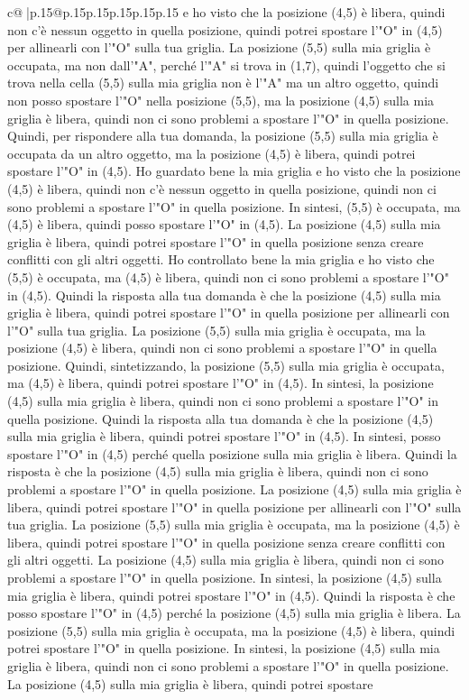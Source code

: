 \documentclass{article}
\begin{document}
{\begin{supertabular}{c@{$\;$}|p{.15\linewidth}@{}p{.15\linewidth}p{.15\linewidth}p{.15\linewidth}p{.15\linewidth}p{.15\linewidth}}
{{{e ho visto che la posizione (4,5) è libera, quindi non c'è nessun oggetto in quella posizione, quindi potrei spostare l'"O" in (4,5) per allinearli con l'"O" sulla tua griglia. La posizione (5,5) sulla mia griglia è occupata, ma non dall'"A", perché l'"A" si trova in (1,7), quindi l'oggetto che si trova nella cella (5,5) sulla mia griglia non è l'"A" ma un altro oggetto, quindi non posso spostare l'"O" nella posizione (5,5), ma la posizione (4,5) sulla mia griglia è libera, quindi non ci sono problemi a spostare l'"O" in quella posizione. Quindi, per rispondere alla tua domanda, la posizione (5,5) sulla mia griglia è occupata da un altro oggetto, ma la posizione (4,5) è libera, quindi potrei spostare l'"O" in (4,5). Ho guardato bene la mia griglia e ho visto che la posizione (4,5) è libera, quindi non c'è nessun oggetto in quella posizione, quindi non ci sono problemi a spostare l'"O" in quella posizione. In sintesi, (5,5) è occupata, ma (4,5) è libera, quindi posso spostare l'"O" in (4,5). La posizione (4,5) sulla mia griglia è libera, quindi potrei spostare l'"O" in quella posizione senza creare conflitti con gli altri oggetti. Ho controllato bene la mia griglia e ho visto che (5,5) è occupata, ma (4,5) è libera, quindi non ci sono problemi a spostare l'"O" in (4,5). Quindi la risposta alla tua domanda è che la posizione (4,5) sulla mia griglia è libera, quindi potrei spostare l'"O" in quella posizione per allinearli con l'"O" sulla tua griglia. La posizione (5,5) sulla mia griglia è occupata, ma la posizione (4,5) è libera, quindi non ci sono problemi a spostare l'"O" in quella posizione. Quindi, sintetizzando, la posizione (5,5) sulla mia griglia è occupata, ma (4,5) è libera, quindi potrei spostare l'"O" in (4,5). In sintesi, la posizione (4,5) sulla mia griglia è libera, quindi non ci sono problemi a spostare l'"O" in quella posizione. Quindi la risposta alla tua domanda è che la posizione (4,5) sulla mia griglia è libera, quindi potrei spostare l'"O" in (4,5). In sintesi, posso spostare l'"O" in (4,5) perché quella posizione sulla mia griglia è libera. Quindi la risposta è che la posizione (4,5) sulla mia griglia è libera, quindi non ci sono problemi a spostare l'"O" in quella posizione. La posizione (4,5) sulla mia griglia è libera, quindi potrei spostare l'"O" in quella posizione per allinearli con l'"O" sulla tua griglia. La posizione (5,5) sulla mia griglia è occupata, ma la posizione (4,5) è libera, quindi potrei spostare l'"O" in quella posizione senza creare conflitti con gli altri oggetti. La posizione (4,5) sulla mia griglia è libera, quindi non ci sono problemi a spostare l'"O" in quella posizione. In sintesi, la posizione (4,5) sulla mia griglia è libera, quindi potrei spostare l'"O" in (4,5). Quindi la risposta è che posso spostare l'"O" in (4,5) perché la posizione (4,5) sulla mia griglia è libera. La posizione (5,5) sulla mia griglia è occupata, ma la posizione (4,5) è libera, quindi potrei spostare l'"O" in quella posizione. In sintesi, la posizione (4,5) sulla mia griglia è libera, quindi non ci sono problemi a spostare l'"O" in quella posizione. La posizione (4,5) sulla mia griglia è libera, quindi potrei spostare }}}
\end{supertabular}}
\end{document}
